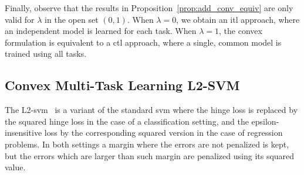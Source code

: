 Finally, observe that the results in Proposition~\ref{prop:add_conv_equiv} are only valid for $\lambda$ in the open set $(0, 1)$. 
When $\lambda=0$, we obtain an \acrshort{itl} approach, where an independent model is learned for each task. When $\lambda=1$, the convex formulation is equivalent to a \acrshort{ctl} approach, where a single, common model is trained using all tasks.






\subsection{Convex Multi-Task Learning L2-SVM}
The L2-\acrshort{svm}~\citep{Burges98} is a variant of the standard \acrshort{svm} where the hinge loss is replaced by the squared hinge loss in the case of a classification setting, and the epsilon-insensitive loss by the corresponding squared version in the case of regression problems. In both settings a margin where the errors are not penalized is kept, but the errors which are larger than such margin are penalized using its squared value.

